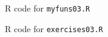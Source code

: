 \documentclass{article}
\newcommand{\1}{\mathbf{1}}
\newcommand{\rscript}[2]{
\begin{itemize}
\item[]
\end{itemize}
}
\begin{document}

\pagebreak
R code for \texttt{myfuns03.R}

\pagebreak
R code for \texttt{exercises03.R}



\end{document}
